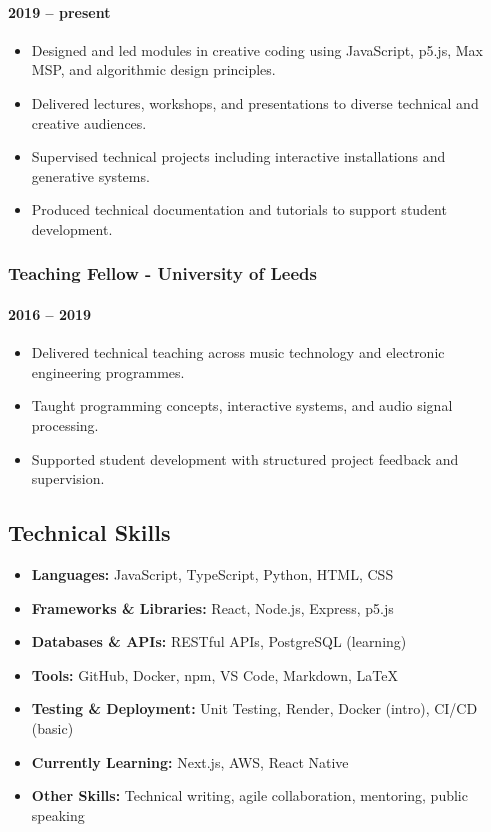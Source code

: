 \documentclass[11pt,a4paper]{article}
\providecommand{\tightlist}{%
  \setlength{\itemsep}{0pt}\setlength{\parskip}{0pt}}
\begin{document}
\paragraph{2019 -- present}\label{present}

\begin{itemize}
\tightlist
\item
  Designed and led modules in creative coding using JavaScript, p5.js,
  Max MSP, and algorithmic design principles.
\item
  Delivered lectures, workshops, and presentations to diverse technical
  and creative audiences.
\item
  Supervised technical projects including interactive installations and
  generative systems.
\item
  Produced technical documentation and tutorials to support student
  development.
\end{itemize}

\subsubsection{Teaching Fellow - University of
Leeds}\label{teaching-fellow---university-of-leeds}

\paragraph{2016 -- 2019}\label{section}

\begin{itemize}
\tightlist
\item
  Delivered technical teaching across music technology and electronic
  engineering programmes.
\item
  Taught programming concepts, interactive systems, and audio signal
  processing.
\item
  Supported student development with structured project feedback and
  supervision.
\end{itemize}

\subsection{Technical Skills}\label{technical-skills}

\begin{itemize}
\tightlist
\item
  \textbf{Languages:} JavaScript, TypeScript, Python, HTML, CSS
\item
  \textbf{Frameworks \& Libraries:} React, Node.js, Express, p5.js
\item
  \textbf{Databases \& APIs:} RESTful APIs, PostgreSQL (learning)
\item
  \textbf{Tools:} GitHub, Docker, npm, VS Code, Markdown, LaTeX
\item
  \textbf{Testing \& Deployment:} Unit Testing, Render, Docker (intro),
  CI/CD (basic)
\item
  \textbf{Currently Learning:} Next.js, AWS, React Native
\item
  \textbf{Other Skills:} Technical writing, agile collaboration,
  mentoring, public speaking
\end{itemize}
\end{document}
